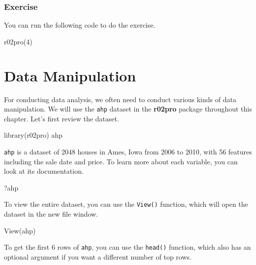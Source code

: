 \documentclass[
]{book}
\newenvironment{Shaded}{\begin{snugshade}}{\end{snugshade}}
\newcommand{\DecValTok}[1]{\textcolor[rgb]{0.00,0.00,0.81}{#1}}
\newcommand{\FunctionTok}[1]{\textcolor[rgb]{0.00,0.00,0.00}{#1}}
\newcommand{\NormalTok}[1]{#1}
\begin{document}
\hypertarget{exercise-2}{%
\subsection{Exercise}\label{exercise-2}}

You can run the following code to do the exercise.

\begin{Shaded}
\begin{Highlighting}[]
\FunctionTok{r02pro}\NormalTok{(}\DecValTok{4}\NormalTok{)}
\end{Highlighting}
\end{Shaded}

\hypertarget{data-manipulation}{%
\chapter{Data Manipulation}\label{data-manipulation}}

For conducting data analysis, we often need to conduct various kinds of data manipulation. We will use the \texttt{ahp} dataset in the \textbf{r02pro} package throughout this chapter. Let's first review the dataset.

\begin{Shaded}
\begin{Highlighting}[]
\FunctionTok{library}\NormalTok{(r02pro)}
\NormalTok{ahp}
\end{Highlighting}
\end{Shaded}

\texttt{ahp} is a dataset of 2048 houses in Ames, Iowa from 2006 to 2010, with 56 features including the sale date and price. To learn more about each variable, you can look at its documentation.

\begin{Shaded}
\begin{Highlighting}[]
\NormalTok{?ahp}
\end{Highlighting}
\end{Shaded}

To view the entire dataset, you can use the \texttt{View()} function, which will open the dataset in the new file window.

\begin{Shaded}
\begin{Highlighting}[]
\FunctionTok{View}\NormalTok{(ahp)}
\end{Highlighting}
\end{Shaded}

To get the first 6 rows of \texttt{ahp}, you can use the \texttt{head()} function, which also has an optional argument if you want a different number of top rows.
\end{document}
